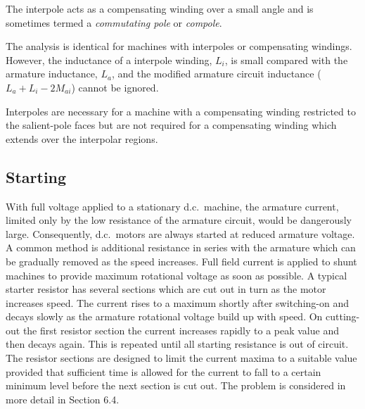 \documentclass[a4paper,numbers=noenddot,12pt]{scrbook}
\begin{document}
The interpole acts as a compensating winding over a small angle and is sometimes termed a \textit{commutating pole} or \textit{compole}.

The analysis is identical for machines with interpoles or compensating windings. However, the inductance of a interpole winding, $L_i$, is small compared with the armature inductance, $L_a$, and the modified armature circuit inductance ($L_a + L_i - 2M_{ai}$) cannot be ignored.

Interpoles are necessary for a machine with a compensating winding restricted to the salient-pole faces but are not required for a compensating winding which extends over the interpolar regions.

\subsection{Starting}
With full voltage applied to a stationary d.c.\ machine, the armature current, limited only by the low resistance of the armature circuit, would be dangerously large. Consequently, d.c.\ motors are always started at reduced armature voltage. A common method is additional resistance  in series with the armature which can be gradually removed as the speed increases. Full field current is applied to shunt machines to provide maximum rotational voltage as soon as possible. A typical
starter resistor has several sections which are cut out in turn as the motor increases speed. The current rises to a maximum shortly after switching-on and decays slowly as the armature rotational voltage build up with speed. On cutting-out the first resistor section the current increases rapidly to a peak value and then decays again. This is repeated until all starting resistance is out of circuit. The resistor sections are designed to limit the current maxima to a suitable
value provided that sufficient time is allowed for the current to fall to a certain minimum level before the next section is cut out. The problem is considered in more detail in Section 6.4.
\end{document}
